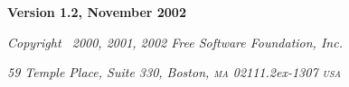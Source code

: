 \chapter[\thefdl]{{\LARGE\thefdl}}

\par \narrowbaselines \par

\newenvironment{anumerate}
  {\def\theenumi{\Alph{enumi}}%
   \enumerate}
  {\endenumerate}

\begin{center}
 \textbf{Version 1.2, November 2002}

 \textit{Copyright \textcopyright\ 2000, 2001, 2002 Free Software Foundation, Inc.}

 \textit{59 Temple Place, Suite 330, Boston, \textsc{ma} 02111\raise.2ex\hbox{-}1307 \textsc{usa}}

\end{center}

\bgroup
\footnotesize

\makeatletter
\def \section {%
    \@startsection{section}{1}{\z@}%
    {0.6\Cvs}{0.4\Cvs}%
    {\normalfont \large \headfont \raggedright}}
\setlength\columnsep{1.5em}
\makeatother


